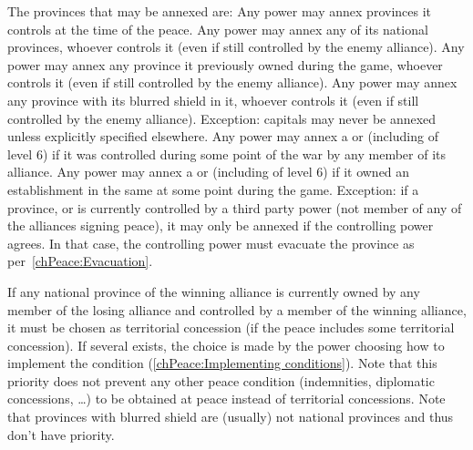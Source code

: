  The provinces that may be annexed are:
\bparag Any power may annex provinces it controls at the time of the peace.
\bparag Any power may annex any of its national provinces, whoever controls it
(even if still controlled by the enemy alliance).
\bparag Any power may annex any province it previously owned during the game,
whoever controls it (even if still controlled by the enemy alliance).
\bparag Any power may annex any province with its blurred shield in it,
whoever controls it (even if still controlled by the enemy alliance).
\bparag Exception: capitals may never be annexed unless explicitly specified
elsewhere.
\bparag Any power may annex a \TP or \COL (including of level 6) if it was
controlled during some point of the war by any member of its alliance.
\bparag Any power may annex a \TP or \COL (including of level 6) if it owned
an establishment in the same \Area at some point during the game.
\bparag Exception: if a province, \TP or \COL is currently controlled by a
third party power (not member of any of the alliances signing peace), it may
only be annexed if the controlling power agrees. In that case, the controlling
power must evacuate the province as per~\ref{chPeace:Evacuation}.

\aparag[Priority] If any national province of the winning alliance is
currently owned by any member of the losing alliance and controlled by a
member of the winning alliance, it must be chosen as territorial concession
(if the peace includes some territorial concession).
\bparag If several exists, the choice is made by the power choosing how to
implement the condition (\ref{chPeace:Implementing conditions}).
\bparag Note that this priority does not prevent any other peace condition
(indemnities, diplomatic concessions, \ldots) to be obtained at peace instead
of territorial concessions.
\bparag Note that provinces with blurred shield are (usually) not national
provinces and thus don't have priority.

